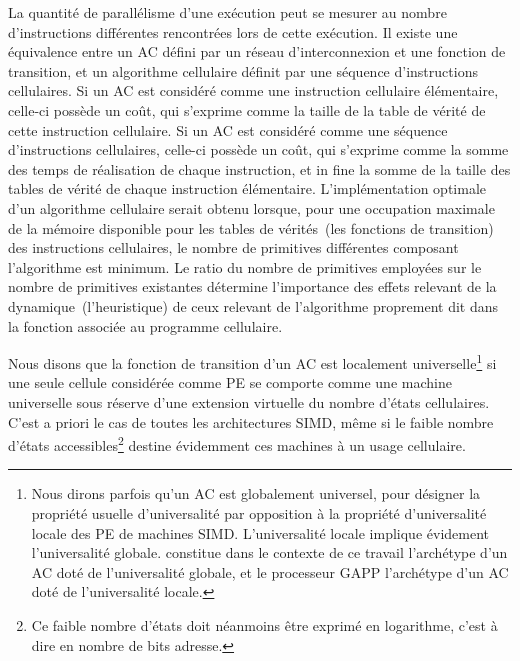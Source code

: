 La quantit\'e de parall\'elisme d'une ex\'ecution peut se mesurer au nombre
d'instructions diff\'erentes rencontr\'ees lors de cette ex\'ecution. %
Il existe une \'equivalence entre un AC d\'efini par un r\'eseau
d'interconnexion et une fonction de transition, et un algorithme
cellulaire d\'efinit par une s\'equence d'instructions
cellulaires. %
Si un AC est consid\'er\'e comme une instruction cellulaire \'el\'ementaire,
celle-ci poss\`ede un co\^ut, qui s'exprime comme la taille de la table
de v\'erit\'e de cette instruction cellulaire. %
Si un AC est consid\'er\'e comme une s\'equence d'instructions cellulaires,
celle-ci poss\`ede un co\^ut, qui s'exprime comme la somme des temps de
r\'ealisation de chaque instruction, et in fine la somme de la taille
des tables de v\'erit\'e de chaque instruction \'el\'ementaire. %
L'impl\'ementation optimale d'un algorithme cellulaire serait obtenu
lorsque, pour une occupation maximale de la m\'emoire disponible pour les
tables de v\'erit\'es~(les fonctions de transition) des instructions
cellulaires, le nombre de primitives diff\'erentes composant l'algorithme
est minimum. %
Le ratio du nombre de primitives employ\'ees sur le nombre de primitives
existantes d\'etermine l'importance des effets relevant de la
dynamique~(l'heuristique) de ceux relevant de l'algorithme proprement
dit dans la fonction associ\'ee au programme cellulaire.

Nous disons que la fonction de transition d'un AC est localement
univer\-selle\footnote{%
  Nous dirons parfois qu'un AC est globalement universel, pour
  d\'esigner la propri\'et\'e usuelle d'universalit\'e par opposition \`a la
  propri\'et\'e d'universalit\'e locale des PE de machines SIMD\@. %
  L'universalit\'e locale implique \'evidement l'universalit\'e globale. %
   constitue dans le contexte de ce travail l'arch\'etype
  d'un AC dot\'e de l'universalit\'e globale, et le processeur GAPP
  l'arch\'etype d'un AC dot\'e de l'universalit\'e locale.} %
si une seule cellule consid\'er\'ee comme PE se comporte comme une machine
universelle sous r\'eserve d'une extension virtuelle du nombre d'\'etats
cellulaires. %
C'est a priori le cas de toutes les architectures SIMD,
m\^eme si le faible nombre d'\'etats accessibles\footnote{%
  Ce faible nombre d'\'etats doit n\'eanmoins \^etre exprim\'e en logarithme,
  c'est \`a dire en nombre de bits adresse.} %
destine \'evidemment ces machines \`a un usage cellulaire. %

